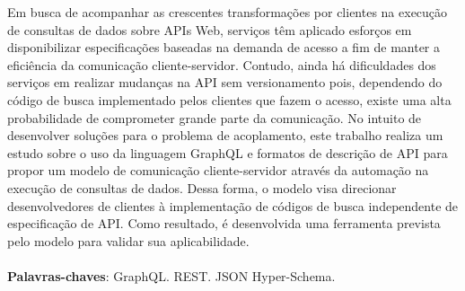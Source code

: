 \begin{resumo}
  Em busca de acompanhar as crescentes transformações por clientes na execução de consultas de dados sobre APIs Web, serviços têm aplicado esforços em disponibilizar especificações baseadas na demanda de acesso a fim de manter a eficiência da comunicação cliente-servidor. Contudo, ainda há dificuldades dos serviços em realizar mudanças na API sem versionamento pois, dependendo do código de busca implementado pelos clientes que fazem o acesso, existe uma alta probabilidade de comprometer grande parte da comunicação. No intuito de desenvolver soluções para o problema de acoplamento, este trabalho realiza um estudo sobre o uso da linguagem GraphQL e formatos de descrição de API para propor um modelo de comunicação cliente-servidor através da automação na execução de consultas de dados. Dessa forma, o modelo visa direcionar desenvolvedores de clientes à implementação de códigos de busca independente de especificação de API. Como resultado, é desenvolvida uma ferramenta prevista pelo modelo para validar sua aplicabilidade. \\ \\
  \textbf{Palavras-chaves}: GraphQL. REST. JSON Hyper-Schema.
\end{resumo}
